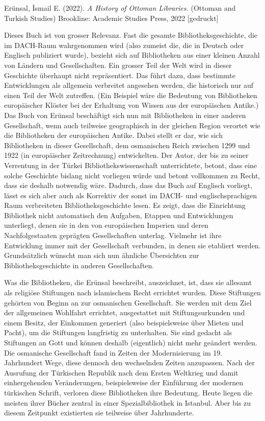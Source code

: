 \documentclass[a4paper,
fontsize=11pt,
oneside,
numbers=noperiodatend,
parskip=half-,
bibliography=totoc,
final
]{scrartcl}
\begin{document}
Erünsal, İsmail E. (2022). \emph{A History of Ottoman Libraries.}
(Ottoman and Turkish Studies) Brookline: Academic Studies Press, 2022
{[}gedruckt{]}

Dieses Buch ist von grosser Relevanz. Fast die gesamte
Bibliotheksgeschichte, die im DACH-Raum wahrgenommen wird (also zumeist
die, die in Deutsch oder Englisch publiziert wurde), bezieht sich auf
Bibliotheken aus einer kleinen Anzahl von Ländern und Gesellschaften.
Ein grosser Teil der Welt wird in dieser Geschichte überhaupt nicht
repräsentiert. Das führt dazu, dass bestimmte Entwicklungen als
allgemein verbreitet angesehen werden, die historisch nur auf einen Teil
der Welt zutreffen. (Ein Beispiel wäre die Bedeutung von Bibliotheken
europäischer Klöster bei der Erhaltung von Wissen aus der europäischen
Antike.) Das Buch von Erünsal beschäftigt sich nun mit Bibliotheken in
einer anderen Gesellschaft, wenn auch teilweise geographisch in der
gleichen Region verortet wie die Bibliotheken der europäischen Antike.
Dabei stellt er dar, wie sich Bibliotheken in dieser Gesellschaft, dem
osmanischen Reich zwischen 1299 und 1922 (in europäischer Zeitrechnung)
entwickelten. Der Autor, der bis zu seiner Verrentung in der Türkei
Bibliothekswissenschaft unterrichtete, betont, dass eine solche
Geschichte bislang nicht vorliegen würde und betont vollkommen zu Recht,
dass sie deshalb notwendig wäre. Dadurch, dass das Buch auf Englisch
vorliegt, lässt es sich aber auch als Korrektiv der sonst im DACH- und
englischsprachigen Raum verbreiteten Bibliotheksgeschichte lesen. Es
zeigt, dass die Einrichtung Bibliothek nicht automatisch den Aufgaben,
Etappen und Entwicklungen unterliegt, denen sie in den von europäischen
Imperien und deren Nachfolgestaaten geprägten Gesellschaften unterlag.
Vielmehr ist ihre Entwicklung immer mit der Gesellschaft verbunden, in
denen sie etabliert werden. Grundsätzlich wünscht man sich nun ähnliche
Übersichten zur Bibliotheksgeschichte in anderen Gesellschaften.

Was die Bibliotheken, die Erünsal beschreibt, auszeichnet, ist, dass sie
allesamt als religiöse Stiftungen nach islamischem Recht errichtet
wurden. Diese Stiftungen gehörten von Beginn an zur osmanischen
Gesellschaft. Sie werden mit dem Ziel der allgemeinen Wohlfahrt
errichtet, ausgestattet mit Stiftungsurkunden und einem Besitz, der
Einkommen generiert (also beispielsweise über Mieten und Pacht), um die
Stiftungen langfristig zu unterhalten. Sie sind gedacht als Stiftungen
an Gott und können deshalb (eigentlich) nicht mehr geändert werden. Die
osmanische Gesellschaft fand in Zeiten der Modernisierung im 19.
Jahrhundert Wege, diese dennoch den wechselnden Zeiten anzupassen. Nach
der Ausrufung der Türkischen Republik nach dem Ersten Weltkrieg und
damit einhergehenden Veränderungen, beispielsweise der Einführung der
modernen türkischen Schrift, verloren diese Bibliotheken ihre Bedeutung.
Heute liegen die meisten ihrer Bücher zentral in einer Spezialbibliothek
in Istanbul. Aber bis zu diesem Zeitpunkt existierten sie teilweise über
Jahrhunderte.
\end{document}
